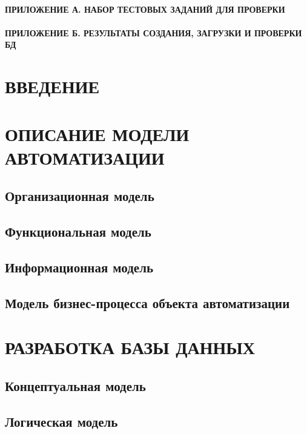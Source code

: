 \documentclass[12pt, a4paper, simple]{eskdtext}
\begin{document}
    

    \tableofcontents
    \thispagestyle{toc}
    \pagestyle{toc}
    \paragraph{ПРИЛОЖЕНИЕ А. НАБОР ТЕСТОВЫХ ЗАДАНИЙ ДЛЯ ПРОВЕРКИ}
    \paragraph{ПРИЛОЖЕНИЕ Б. РЕЗУЛЬТАТЫ СОЗДАНИЯ, ЗАГРУЗКИ И ПРОВЕРКИ БД}
    \newpage

    \newpage
    \section*{ВВЕДЕНИЕ}
    \newpage

    \section{ОПИСАНИЕ МОДЕЛИ АВТОМАТИЗАЦИИ}
    \subsection{Организационная модель}
    \subsection{Функциональная модель}
    \subsection{Информационная модель}
    \subsection{Модель бизнес-процесса объекта автоматизации}
    \newpage

    \section{РАЗРАБОТКА БАЗЫ ДАННЫХ}
    \subsection{Концептуальная модель}
    \subsection{Логическая модель}
\end{document}
